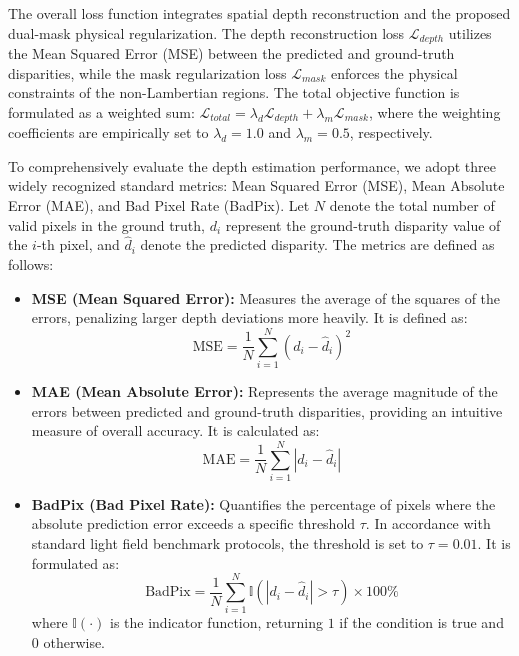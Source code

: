 \documentclass[lettersize,journal]{IEEEtran}
\begin{document}
The overall loss function integrates spatial depth reconstruction and the proposed dual-mask physical regularization. The depth reconstruction loss $\mathcal{L}_{depth}$ utilizes the Mean Squared Error (MSE) between the predicted and ground-truth disparities, while the mask regularization loss $\mathcal{L}_{mask}$ enforces the physical constraints of the non-Lambertian regions. The total objective function is formulated as a weighted sum: $\mathcal{L}_{total} = \lambda_{d} \mathcal{L}_{depth} + \lambda_{m} \mathcal{L}_{mask}$, where the weighting coefficients are empirically set to $\lambda_{d} = 1.0$ and $\lambda_{m} = 0.5$, respectively. 

To comprehensively evaluate the depth estimation performance, we adopt three widely recognized standard metrics: Mean Squared Error (MSE), Mean Absolute Error (MAE), and Bad Pixel Rate (BadPix). Let $N$ denote the total number of valid pixels in the ground truth, $d_i$ represent the ground-truth disparity value of the $i$-th pixel, and $\hat{d}_i$ denote the predicted disparity. The metrics are defined as follows:

\begin{itemize}
    \item \textbf{MSE (Mean Squared Error):} Measures the average of the squares of the errors, penalizing larger depth deviations more heavily. It is defined as:
    \begin{equation}
        \text{MSE} = \frac{1}{N} \sum_{i=1}^{N} (d_i - \hat{d}_i)^2
    \end{equation}
    
    \item \textbf{MAE (Mean Absolute Error):} Represents the average magnitude of the errors between predicted and ground-truth disparities, providing an intuitive measure of overall accuracy. It is calculated as:
    \begin{equation}
        \text{MAE} = \frac{1}{N} \sum_{i=1}^{N} |d_i - \hat{d}_i|
    \end{equation}
    
    \item \textbf{BadPix (Bad Pixel Rate):} Quantifies the percentage of pixels where the absolute prediction error exceeds a specific threshold $\tau$. In accordance with standard light field benchmark protocols, the threshold is set to $\tau = 0.01$. It is formulated as:
    \begin{equation}
        \text{BadPix} = \frac{1}{N} \sum_{i=1}^{N} \mathbb{I}(|d_i - \hat{d}_i| > \tau) \times 100\%
    \end{equation}
    where $\mathbb{I}(\cdot)$ is the indicator function, returning $1$ if the condition is true and $0$ otherwise.
\end{itemize}
\end{document}
